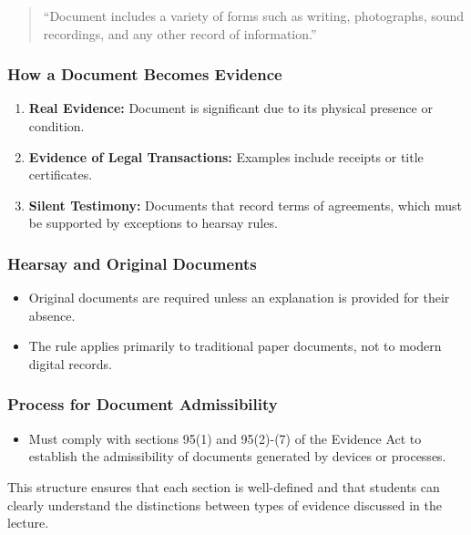 \begin{quote}
``Document includes a variety of forms such as writing, photographs,
sound recordings, and any other record of information.''
\end{quote}

\subsubsection{How a Document Becomes
Evidence}\label{how-a-document-becomes-evidence}

\begin{enumerate}
\def\labelenumi{\arabic{enumi}.}
\tightlist
\item
  \textbf{Real Evidence:} Document is significant due to its physical
  presence or condition.
\item
  \textbf{Evidence of Legal Transactions:} Examples include receipts or
  title certificates.
\item
  \textbf{Silent Testimony:} Documents that record terms of agreements,
  which must be supported by exceptions to hearsay rules.
\end{enumerate}

\subsubsection{Hearsay and Original
Documents}\label{hearsay-and-original-documents}

\begin{itemize}
\tightlist
\item
  Original documents are required unless an explanation is provided for
  their absence.
\item
  The rule applies primarily to traditional paper documents, not to
  modern digital records.
\end{itemize}

\subsubsection{Process for Document
Admissibility}\label{process-for-document-admissibility}

\begin{itemize}
\tightlist
\item
  Must comply with sections 95(1) and 95(2)-(7) of the Evidence Act to
  establish the admissibility of documents generated by devices or
  processes.
\end{itemize}

This structure ensures that each section is well-defined and that
students can clearly understand the distinctions between types of
evidence discussed in the lecture.

